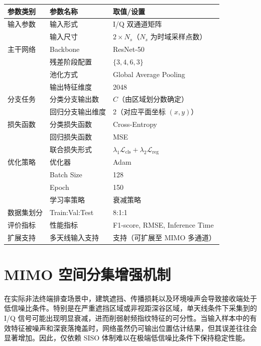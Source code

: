 \begin{table}[htbp]
    \centering
    \label{tab:resnet_params_ch3}
    \begin{tabular}{@{}lll@{}}
        \toprule
        \textbf{参数类别} & \textbf{参数名称} & \textbf{取值/设置} \\ \midrule
        输入参数 & 输入形式 & I/Q 双通道矩阵 \\
        & 输入尺寸 & \(2\times N_s\)（\(N_s\) 为时域采样点数） \\
        主干网络 & Backbone & ResNet-50 \\
        & 残差阶段配置 & \(\{3,4,6,3\}\) \\
        & 池化方式 & Global Average Pooling \\
        & 输出特征维度 & 2048 \\
        分支任务 & 分类分支输出数 & \(C\)（由区域划分数确定） \\
        & 回归分支输出维度 & 2（对应平面坐标 \((x,y)\)） \\
        损失函数 & 分类损失函数 & Cross-Entropy \\
        & 回归损失函数 & MSE \\
        & 联合损失形式 & \(\lambda_1 \mathcal{L}_{\mathrm{cls}}+\lambda_2 \mathcal{L}_{\mathrm{reg}}\) \\
        优化策略 & 优化器 & Adam \\
        & Batch Size & 128 \\
        & Epoch & 150 \\
        & 学习率策略 & 衰减策略 \\
        数据集划分 & Train:Val:Test & 8:1:1 \\
        评价指标 & 性能指标 & F1-score, RMSE, Inference Time \\
        扩展支持 & 多天线输入支持 & 支持（可扩展至 MIMO 多通道） \\ \bottomrule
    \end{tabular}
\end{table}

\section{MIMO 空间分集增强机制}
\label{sec:3_4}

在实际非法终端排查场景中，建筑遮挡、传播损耗以及环境噪声会导致接收端处于低信噪比条件。特别是在严重遮挡区域或非视距深谷区域，单天线条件下采集到的 I/Q 信号可能出现明显衰减，进而削弱射频指纹特征的可分性。当输入样本中的有效特征被噪声和深衰落掩盖时，网络虽然仍可输出位置估计结果，但其误差往往会显著增加。因此，仅依赖 SISO 体制难以在极端低信噪比条件下保持稳定性能。

